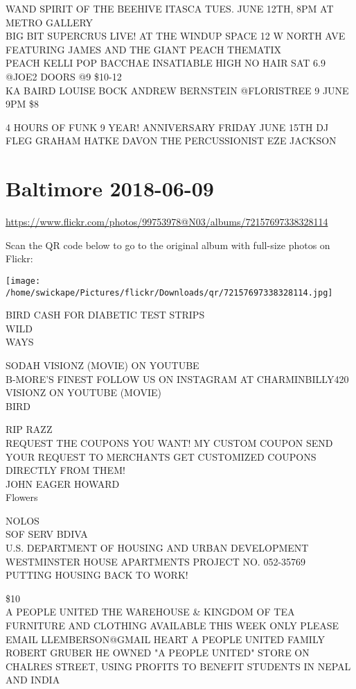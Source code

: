 \documentclass[10pt,letterpaper]{article}
\begin{document}
WAND SPIRIT OF THE BEEHIVE ITASCA TUES. JUNE 12TH, 8PM AT METRO GALLERY\\
BIG BIT SUPERCRUS LIVE! AT THE WINDUP SPACE 12 W NORTH AVE FEATURING JAMES AND THE GIANT PEACH THEMATIX\\
PEACH KELLI POP BACCHAE INSATIABLE HIGH NO HAIR SAT 6.9 @JOE2 DOORS @9 \$10{-}12\\
KA BAIRD LOUISE BOCK ANDREW BERNSTEIN @FLORISTREE 9 JUNE 9PM \$8

4 HOURS OF FUNK 9 YEAR! ANNIVERSARY FRIDAY JUNE 15TH DJ FLEG GRAHAM HATKE DAVON THE PERCUSSIONIST EZE JACKSON


\section*{Baltimore 2018-06-09}

\url{https://www.flickr.com/photos/99753978@N03/albums/72157697338328114}

Scan the QR code below to go to the original album with full-size photos on Flickr:

\texttt{[image: /home/swickape/Pictures/flickr/Downloads/qr/72157697338328114.jpg]}


BIRD CASH FOR DIABETIC TEST STRIPS\\
WILD\\
WAYS

SODAH VISIONZ (MOVIE) ON YOUTUBE\\
B{-}MORE'S FINEST FOLLOW US ON INSTAGRAM AT CHARMINBILLY420\\
VISIONZ ON YOUTUBE (MOVIE)\\
BIRD

RIP RAZZ\\
REQUEST THE COUPONS YOU WANT!  MY CUSTOM COUPON SEND YOUR REQUEST TO MERCHANTS GET CUSTOMIZED COUPONS DIRECTLY FROM THEM!\\
JOHN EAGER HOWARD\\
Flowers

NOLOS\\
SOF SERV BDIVA\\
U.S. DEPARTMENT OF HOUSING AND URBAN DEVELOPMENT WESTMINSTER HOUSE APARTMENTS PROJECT NO. 052{-}35769\\
PUTTING HOUSING BACK TO WORK!

\$10\\
A PEOPLE UNITED THE WAREHOUSE \& KINGDOM OF TEA\\
FURNITURE AND CLOTHING AVAILABLE THIS WEEK ONLY PLEASE EMAIL LLEMBERSON@GMAIL HEART A PEOPLE UNITED FAMILY\\
ROBERT GRUBER HE OWNED "A PEOPLE UNITED" STORE ON CHALRES STREET, USING PROFITS TO BENEFIT STUDENTS IN NEPAL AND INDIA
\end{document}
